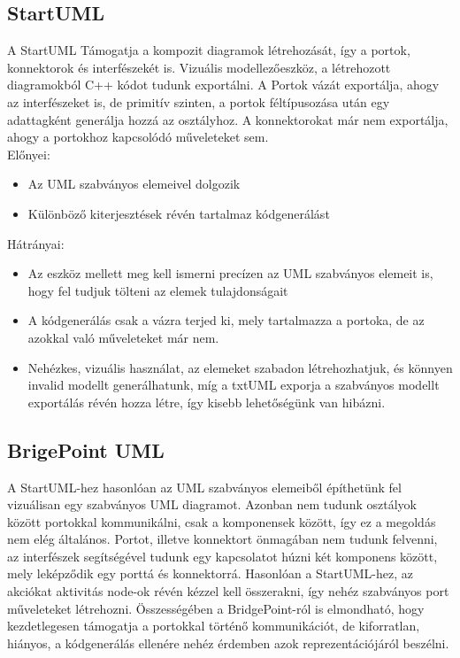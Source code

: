 \documentclass[a4paper,12pt]{report}
\begin{document}
\subsection{StartUML}
A StartUML  Támogatja a kompozit diagramok létrehozását, így a portok, konnektorok és interfészekét is. Vizuális modellezőeszköz, a létrehozott diagramokból C++ kódot tudunk exportálni. A Portok vázát exportálja, ahogy az interfészeket is, de primitív szinten, a portok féltípusozása után egy adattagként generálja hozzá az osztályhoz. A konnektorokat már nem exportálja, ahogy a portokhoz kapcsolódó műveleteket sem. \\
Előnyei:
\begin{itemize}
\item Az UML szabványos elemeivel dolgozik
\item Különböző kiterjesztések révén tartalmaz kódgenerálást
\end{itemize}
Hátrányai:
\begin{itemize}
\item Az eszköz mellett meg kell ismerni precízen az UML szabványos elemeit is, hogy fel tudjuk tölteni az elemek tulajdonságait
\item A kódgenerálás csak a vázra terjed ki, mely tartalmazza a portoka, de az azokkal való műveleteket már nem.
\item Nehézkes, vizuális használat, az elemeket szabadon létrehozhatjuk, és könnyen invalid modellt generálhatunk, míg a txtUML exporja a szabványos modellt exportálás révén hozza létre, így kisebb lehetőségünk van hibázni.
\end{itemize}

\subsection{BrigePoint UML}
A StartUML-hez hasonlóan az UML szabványos elemeiből építhetünk fel vizuálisan egy szabványos UML diagramot. Azonban nem tudunk osztályok között portokkal kommunikálni, csak a komponensek között, így ez a megoldás nem elég általános. Portot, illetve konnektort önmagában nem tudunk felvenni, az interfészek segítségével tudunk egy kapcsolatot húzni két komponens között, mely leképződik egy porttá és konnektorrá. Hasonlóan a StartUML-hez, az akciókat aktivitás node-ok révén kézzel kell összerakni, így nehéz szabványos port műveleteket létrehozni. Összességében a BridgePoint-ról \cite{bridge} is elmondható, hogy kezdetlegesen támogatja a portokkal történő kommunikációt, de kiforratlan, hiányos, a kódgenerálás ellenére nehéz érdemben azok reprezentációjáról beszélni. 
\end{document}
